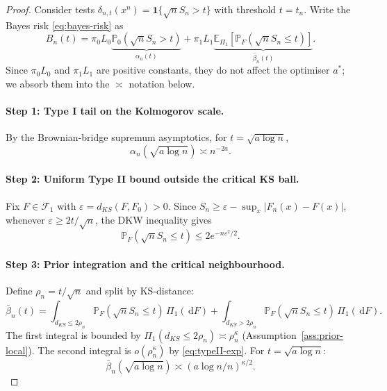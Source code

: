\documentclass[11pt]{article}
\newcommand{\E}{\mathbb{E}}
\newcommand{\calF}{\mathcal{F}}
\newcommand{\diff}{\,\mathrm{d}}
\newcommand{\1}{\mathbf{1}}
\newcommand{\PP}{\mathbb{P}}
\theoremstyle{plain}
\theoremstyle{definition}
\theoremstyle{remark}
\begin{document}
\begin{proof}
Consider tests $\delta_{n,t}(x^n)=\1\{\sqrt{n}S_n>t\}$ with threshold $t=t_n$.
Write the Bayes risk \eqref{eq:bayes-risk} as
\begin{equation}\label{eq:BR-decomp}
B_n(t)=\pi_0 L_0\underbrace{\PP_{0}(\sqrt{n}S_n>t)}_{\alpha_n(t)}
+
\pi_1 L_1\underbrace{\E_{\Pi_1}\!\left[\PP_{F}(\sqrt{n}S_n\le t)\right]}_{\bar\beta_n(t)}.
\end{equation}
Since $\pi_0 L_0$ and $\pi_1 L_1$ are positive constants, they do not affect the optimiser $a^*$; we absorb them into the $\asymp$ notation below.

\paragraph{Step 1: Type I tail on the Kolmogorov scale.}
By the Brownian-bridge supremum asymptotics, for $t=\sqrt{a\log n}$,
\begin{equation}\label{eq:typeI-mdp}
\alpha_n(\sqrt{a\log n}) \asymp n^{-2a}.
\end{equation}

\paragraph{Step 2: Uniform Type II bound outside the critical KS ball.}
Fix $F\in\calF_1$ with $\varepsilon=d_{KS}(F,F_0)>0$.
Since $S_n \ge \varepsilon - \sup_x|F_n(x)-F(x)|$, whenever $\varepsilon\ge 2t/\sqrt{n}$, the DKW inequality gives
\begin{equation}\label{eq:typeII-exp}
\PP_F(\sqrt{n}S_n\le t) \le 2e^{-n\varepsilon^2/2}.
\end{equation}

\paragraph{Step 3: Prior integration and the critical neighbourhood.}
Define $\rho_n=t/\sqrt{n}$ and split by KS-distance:
\[
\bar\beta_n(t)
=
\int_{d_{KS}\le 2\rho_n}\PP_F(\sqrt{n}S_n\le t)\,\Pi_1(\diff F)
+
\int_{d_{KS}>2\rho_n}\PP_F(\sqrt{n}S_n\le t)\,\Pi_1(\diff F).
\]
The first integral is bounded by $\Pi_1(d_{KS}\le 2\rho_n) \asymp \rho_n^{\kappa}$ (Assumption~\ref{ass:prior-local}).
The second integral is $o(\rho_n^{\kappa})$ by \eqref{eq:typeII-exp}.
For $t=\sqrt{a\log n}$:
\begin{equation}\label{eq:beta-mdp2}
\bar\beta_n(\sqrt{a\log n}) \asymp (a\log n/n)^{\kappa/2}.
\end{equation}


\end{proof}
\end{document}
